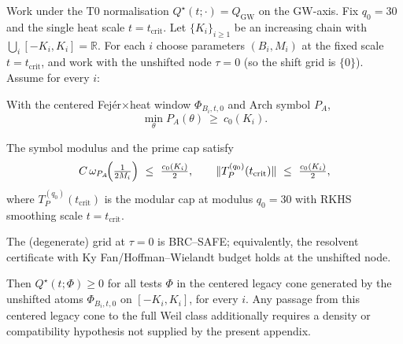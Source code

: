 \begin{theorem}[AB$\boldsymbol{\infty}$ legacy centered-cone closure (fixed $q=30$, BRC--SAFE default)]\label{thm:ABinfty}
Work under the T0 normalisation $Q^\star(t;\cdot)=Q_{\mathrm{GW}}$ on the GW-axis.
Fix $q_0=30$ and the single heat scale $t=t_{\mathrm{crit}}$. Let $\{K_i\}_{i\ge1}$ be an increasing chain with $\bigcup_i[-K_i,K_i]=\mathbb{R}$.
For each $i$ choose parameters $(B_i,M_i)$ at the fixed scale $t=t_{\mathrm{crit}}$, and work with the unshifted node $\tau=0$ (so the shift grid is $\{0\}$).
Assume for every $i$:

\begin{description}[leftmargin=3.2em,labelwidth=2em]
\item[\textbf{(R)} Arch floor (A3).]
With the centered Fej\'er$\times$heat window $\Phi_{B_i,t,0}$ and Arch symbol $P_A$,
\begin{equation}\label{eq:ab_infinity_lemma-formula}
\min_{\theta} P_A(\theta)\ \ge\ c_0(K_i).
\end{equation}

\item[\textbf{(N)} Nyquist \& Norm.]
The symbol modulus and the prime cap satisfy
\begin{equation}\label{eq:ab_infinity_lemma-omega}
C\,\omega_{P_A}\!\Bigl(\tfrac{1}{2M_i}\Bigr)\ \le\ \tfrac{c_0(K_i)}{2},
\qquad
\|T_P^{(q_0)}(t_{\mathrm{crit}})\|\ \le\ \tfrac{c_0(K_i)}{2},
\end{equation}
where $T_P^{(q_0)}(t_{\mathrm{crit}})$ is the modular cap at modulus $q_0=30$ with RKHS smoothing scale $t=t_{\mathrm{crit}}$.

\item[\textbf{(A)} Grid$\to$continuum (BRC--SAFE default).]
The (degenerate) grid at $\tau=0$ is \textup{\textsc{BRC}}--\textup{\textsc{SAFE}}; equivalently, the resolvent
certificate with Ky Fan/Hoffman--Wielandt budget holds at the unshifted node.
\end{description}

Then $Q^\star(t;\Phi)\ge0$ for all tests $\Phi$ in the centered legacy cone generated by the unshifted atoms $\Phi_{B_i,t,0}$ on $[-K_i,K_i]$, for every $i$.
Any passage from this centered legacy cone to the full Weil class additionally requires a density or compatibility hypothesis not supplied by the present appendix.
\end{theorem}


